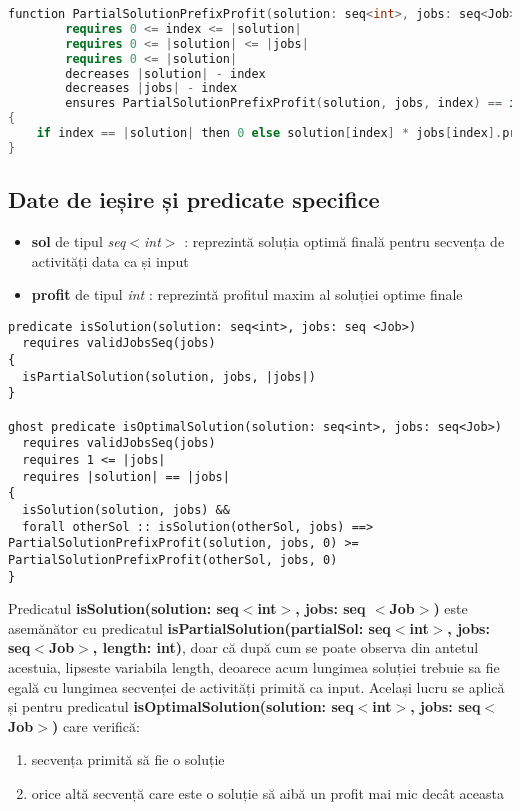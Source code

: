 \begin{lstlisting}[language=C++]
    function PartialSolutionPrefixProfit(solution: seq<int>, jobs: seq<Job>, index: int): int
        requires 0 <= index <= |solution|
        requires 0 <= |solution| <= |jobs|
        requires 0 <= |solution|
        decreases |solution| - index 
        decreases |jobs| - index
        ensures PartialSolutionPrefixProfit(solution, jobs, index) == if index == |solution| then 0 else solution[index] * jobs[index].profit + PartialSolutionPrefixProfit(solution, jobs, index + 1)
{   
    if index == |solution| then 0 else solution[index] * jobs[index].profit + PartialSolutionPrefixProfit(solution, jobs, index + 1)
}
\end{lstlisting}
\subsection{Date de ieșire și predicate specifice }
\begin{itemize}
    \item \textbf{sol} de tipul {\textit{seq$<$int$>$}} : reprezintă soluția optimă finală pentru secvența de activități data ca și input
    \item \textbf{profit} de tipul \textit{int} : reprezintă profitul maxim al soluției optime finale
\end{itemize}

\begin{lstlisting}
predicate isSolution(solution: seq<int>, jobs: seq <Job>)
  requires validJobsSeq(jobs)
{
  isPartialSolution(solution, jobs, |jobs|)
}

ghost predicate isOptimalSolution(solution: seq<int>, jobs: seq<Job>)
  requires validJobsSeq(jobs)
  requires 1 <= |jobs|
  requires |solution| == |jobs|
{
  isSolution(solution, jobs) &&
  forall otherSol :: isSolution(otherSol, jobs) ==>  PartialSolutionPrefixProfit(solution, jobs, 0) >=  PartialSolutionPrefixProfit(otherSol, jobs, 0)
}
\end{lstlisting}
Predicatul \textbf{isSolution(solution: seq$<$int$>$, jobs: seq $<$Job$>$)} este asemănător cu predicatul  \textbf{isPartialSolution(partialSol: seq$<$int$>$, jobs: seq$<$Job$>$, length: int)}, doar că după cum se poate observa din antetul acestuia, lipseste variabila length, deoarece acum lungimea soluției trebuie sa fie egală cu lungimea secvenței de activități primită ca input. Același lucru se aplică și pentru predicatul \textbf{isOptimalSolution(solution: seq$<$int$>$, jobs: seq$<$Job$>$)} care verifică:
\begin{enumerate}
    \item secvența primită să fie o soluție 
    \item orice altă secvență care este o soluție să aibă un profit mai mic decât aceasta
\end{enumerate}

